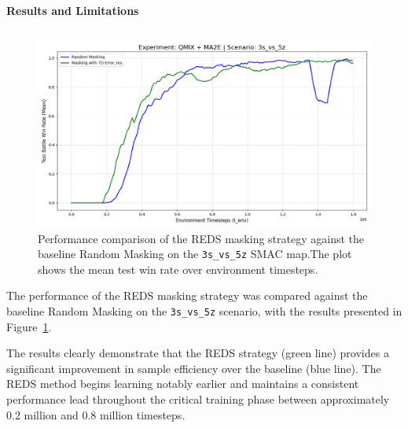 \paragraph{Results and Limitations}
\begin{figure}[H]
    \centering
   
        
    \includegraphics[width= 0.9\linewidth]{images_pfe/results_li-ma2e/test_battle_won_mean_3s_vs_5z_res_smoothed_full.png}
 
  
    \caption{Performance comparison of the REDS masking strategy against the baseline Random Masking on the \texttt{3s\_vs\_5z} SMAC map.The plot shows the mean test win rate over environment timesteps.
    }
    \label{fig:reds_vs_random}
\end{figure}

The performance of the REDS masking strategy was compared  against the baseline Random Masking on the \texttt{3s\_vs\_5z} scenario, with the results presented in Figure~\ref{fig:reds_vs_random}.

The results clearly demonstrate that the REDS strategy (green line) provides a significant improvement in sample efficiency over the baseline (blue line). The REDS method begins learning notably earlier and maintains a consistent performance lead throughout the critical training phase between approximately 0.2 million and 0.8 million timesteps.

